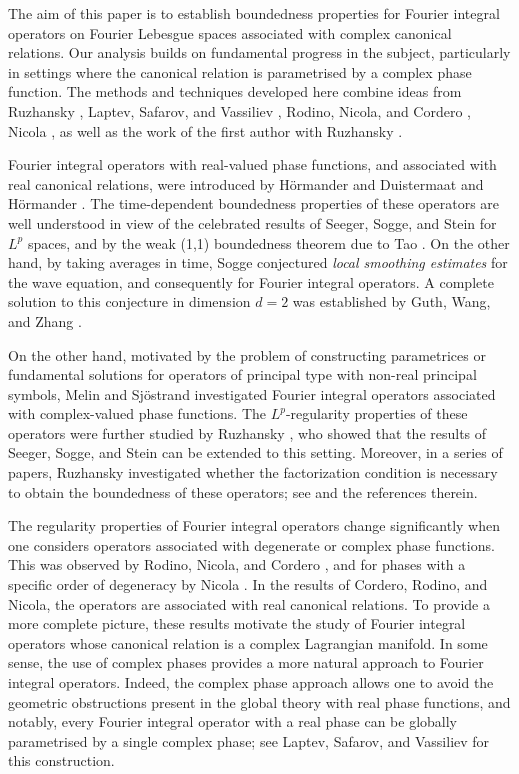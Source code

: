 \documentclass[12pt, reqno]{amsart}
\theoremstyle{definition}
\theoremstyle{remark}
\numberwithin{equation}{section}
\begin{document}
The aim of this paper is to establish boundedness properties for Fourier integral operators on Fourier Lebesgue spaces associated with complex canonical relations. Our analysis builds on fundamental progress in the subject, particularly in settings where the canonical relation is parametrised by a complex phase function. The methods and techniques developed here combine ideas from Ruzhansky \cite{Ruz2001}, Laptev, Safarov, and Vassiliev \cite{Laptev:Safarov:Vassiliev}, Rodino, Nicola, and Cordero \cite{CNR2009}, Nicola \cite{Nicola2010}, as well as the work of the first author with Ruzhansky \cite{CR2024}.

Fourier integral operators with real-valued phase functions, and associated with real canonical relations, were introduced by H\"ormander \cite{Hormander1971Ac} and Duistermaat and H\"ormander \cite{Duistermaat-Hormander:FIOs-2}. The time-dependent boundedness properties of these operators are well understood in view of the celebrated results of Seeger, Sogge, and Stein \cite{SSS} for $L^p$ spaces, and by the weak (1,1) boundedness theorem due to Tao \cite{Tao}. On the other hand, by taking averages in time,  Sogge \cite{Sogge1991} conjectured \emph{local smoothing estimates} for the wave equation, and consequently for Fourier integral operators. A complete solution to this conjecture in dimension $d=2$ was established by Guth, Wang, and Zhang \cite{GWZ2020}.

On the other hand, motivated by the problem of constructing parametrices or fundamental solutions for operators of principal type with non-real principal symbols, Melin and Sj\"ostrand \cite{Melin-Sjostrand1976} investigated Fourier integral operators associated with complex-valued phase functions. The $L^p$-regularity properties of these operators were further studied by Ruzhansky \cite{Ruz2001}, who showed that the results of Seeger, Sogge, and Stein \cite{SSS} can be extended to this setting. Moreover, in a series of papers, Ruzhansky investigated whether the factorization condition is necessary to obtain the boundedness of these operators; see \cite{Ruz2001} and the references therein.

The regularity properties of Fourier integral operators change significantly when one considers operators associated with degenerate or complex phase functions. This was observed by Rodino, Nicola, and Cordero \cite{CNR2009}, and for phases with a specific order of degeneracy by Nicola \cite{Nicola2010}. In the results of Cordero, Rodino, and Nicola, the operators are associated with real canonical relations. To provide a more complete picture, these results motivate the study of Fourier integral operators whose canonical relation is a complex Lagrangian manifold. In some sense, the use of complex phases provides a more natural approach to Fourier integral operators. Indeed, the complex phase approach allows one to avoid the geometric obstructions present in the global theory with real phase functions, and notably, every Fourier integral operator with a real phase can be globally parametrised by a single complex phase; see Laptev, Safarov, and Vassiliev \cite{Laptev:Safarov:Vassiliev} for this construction.
\end{document}
